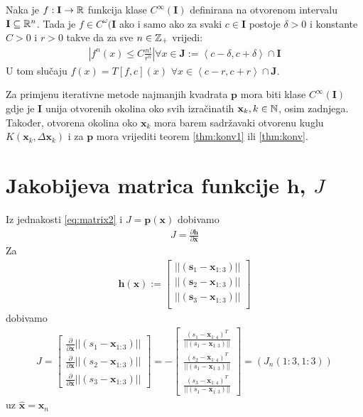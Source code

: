 \documentclass[a4paper,twoside,12pt]{memoir} %
\begin{document}
\begin{thm}\label{thm:konv}
	Naka je $f: \mathbf{I} \to \mathbb{R} $ funkcija klase $C^\infty(\mathbf{I})$ definirana
	na otvorenom intervalu $\mathbf{I} \subseteq \mathbb{R}^n$.
	Tada je $f \in C^\omega(\mathbf{I}$ ako i samo ako za svaki $c \in \mathbf{I}$ postoje
	$\delta > 0$ i konstante $C > 0$ i $ r > 0 $ takve da za sve $n \in \mathbb{Z}_+$ vrijedi:
	\begin{align}
		\left | f^{n}(x)  \leq  C \frac{n!}{r^n}  \right | 
		\forall x \in \mathbf{J} := \left < c-\delta, c+\delta \right > \cap \mathbf{I}
	\end{align}
U tom slučaju $f(x) = T \left[f,c\right](x) $ $
\forall x \in \left < c-r, c+r \right > \cap \mathbf{J}$.
\end{thm}
Za primjenu iterativne metode
najmanjih kvadrata $\mathbf{p}$ mora biti klase $C^\infty(\mathbf{I})$ gdje je $\mathbf{I}$ unija otvorenih okolina oko svih izračinatih $\mathbf{x}_k, k \in \mathbb{N}$, osim zadnjega.
Također, otvorena okolina oko $\mathbf{x}_k$  mora barem sadržavaki otvorenu kuglu $K(\mathbf{x}_k,\Delta \mathbf{x}_k)$ i za $\mathbf{p}$ mora vrijediti teorem \ref{thm:konv1} ili  \ref{thm:konv}.

\chapter{Jakobijeva matrica funkcije $\mathbf{h}$, $J$}
Iz jednakosti \ref{eq:matrix2} i $J = \mathbf{p}(\mathbf{x})$ dobivamo
\begin{align}
J = \frac{\partial \mathbf{h}}{\partial \mathbf{x}}
\end{align}
Za 
\begin{align}
\mathbf{h} (\mathbf{x}) := 
\begin{bmatrix}
||(\mathbf{s}_1-\mathbf{x}_{1:3})|| \\
||(\mathbf{s}_2-\mathbf{x}_{1:3})|| \\
||(\mathbf{s}_3-\mathbf{x}_{1:3})||\\
\end{bmatrix} 
\end{align}
dobivamo
\begin{align}
J = \begin{bmatrix}
\frac{\partial}{\partial \mathbf{x}} ||(s_1-\mathbf{x}_{1:3})|| \\
\frac{\partial}{\partial \mathbf{x}} ||(s_2-\mathbf{x}_{1:3})||\\
\frac{\partial}{\partial \mathbf{x}} ||(s_3-\mathbf{x}_{1:3})|| 
\end{bmatrix}%
= - \begin{bmatrix}
\frac{(s_1-\mathbf{x}_{1:4})^T}{||(s_1-\mathbf{x}_{1:3})||} \\
\frac{(s_2-\mathbf{x}_{1:4})^T}{||(s_1-\mathbf{x}_{1:3})||}\\
\frac{(s_3-\mathbf{x}_{1:4})^T}{||(s_1-\mathbf{x}_{1:3})||} 
\end{bmatrix} = (J_n(1:3,1:3))
\end{align}
uz $\hat{\mathbf{x}} = \mathbf{x}_n$
\end{document}
